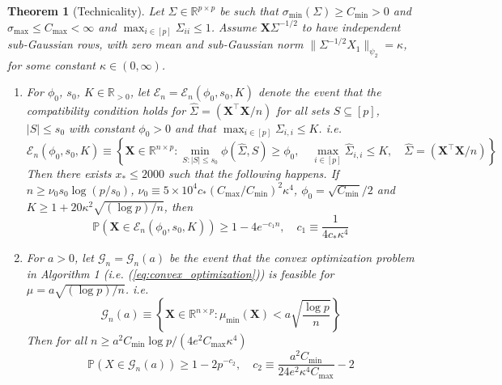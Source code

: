 \documentclass{article}
\newtheorem{theorem}{Theorem}
\begin{document}
\begin{theorem}[Technicality]
\label{thm:thm7}
   Let $\Sigma \in \mathbb{R}^{p\times p}$ be such that $\sigma_{\text{min}}(\Sigma) \ge C_{\text{min}} >0$ and $\sigma_{\text{max}}\le C_{\text{max}}<\infty$ and $\max_{i \in [p]} \Sigma_{ii}\le1$. Assume $\mathbf{X}\Sigma^{-1/2}$ to have independent sub-Gaussian rows, with zero mean and sub-Gaussian norm $\|\Sigma^{-1/2} X_1\|_{\psi_2} = \kappa$, for some constant $\kappa \in (0, \infty)$.
   \begin{enumerate}[label=(\alph*)]
       \item For  $\phi_0$, $s_0$, $K\in \mathbb{R}_{>0}$, let $\mathcal{E}_n = \mathcal{E}_n(\phi_0, s_0, K)$ denote the event that the compatibility condition holds for $\hat{\Sigma} = (\mathbf{X}^\top\mathbf{X}/n)$ for all sets $S \subseteq[p]$, $|S| \le s_0$ with constant $\phi_0>0$ and that $\max_{i\in [p]}\Sigma_{i,i} \le K$. i.e.
       \begin{equation}
           \mathcal{E}_n(\phi_0, s_0, K) \equiv \left\{\mathbf{X}\in \mathbb{R}^{n\times p}: \min_{S: |S| \le s_0} \phi(\hat{\Sigma}, S) \ge \phi_0, \quad \max_{i\in [p]}\hat{\Sigma}_{i,i} \le K,\quad \hat{\Sigma}= (\mathbf{X}^{\top}\mathbf{X}/n)\right\}
       \end{equation}
       Then there exists $x_* \le 2000$ such that the following happens. If $n \ge \nu_0 s_0 \log(p/s_0)$, $\nu_0 \equiv 5 \times 10^4 c_*(C_{\text{max}}/C_{\text{min}})^2 \kappa^4$, $\phi_0 = \sqrt{C_{\text{min}}}/2$ and $K \ge 1 + 20 \kappa^2 \sqrt{(\log p)/n}$, then
       \begin{equation}
           \mathbb{P}(\mathbf{X} \in \mathcal{E}_n(\phi_0, s_0, K)) \ge 1 - 4e^{-c_1n}, \quad c_1 \equiv \frac{1}{4c_* \kappa^4}
       \end{equation}
       \item For $a >0$, let $\mathcal{G}_n= \mathcal{G}_n(a)$ be the event that the convex optimization problem in Algorithm 1 (i.e. (\ref{eq:convex_optimization})) is feasible for $\mu = a \sqrt{(\log p)/n}$. i.e.
       \begin{equation}
           \mathcal{G}_n(a) \equiv \left\{\mathbf{X}\in \mathbb{R}^{n\times p}: \mu_{\text{min}}(\mathbf{X}) < a \sqrt{\frac{\log p}n} \right\}
       \end{equation}
       Then for all $n \ge a^2 C_{\text{min}}\log p /(4e^2C_{\max}\kappa^4)$
       \begin{equation}
               \mathbb{P}(X\in \mathcal{G}_n(a)) \ge 1 - 2p^{-c_2}, \quad c_2 \equiv \frac{a^2 C_{\min}}{24 e^2 \kappa^4 C_{\max}}-2
       \end{equation}
   \end{enumerate}
\end{theorem}
\end{document}
